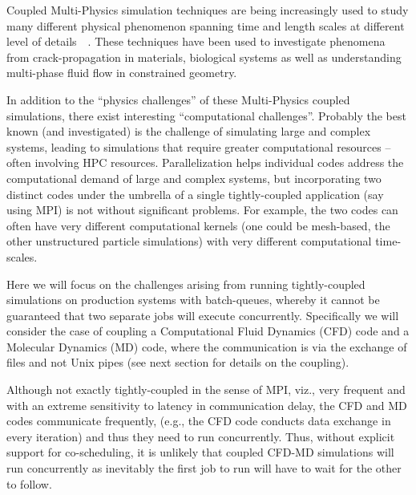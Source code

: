 \documentclass[conference,final]{IEEEtran}
\newcommand{\jhanote}[1]{ {\textcolor{red} { ***Jha: #1 }}}
\newcommand{\jhanote}[1]{}
\begin{document}
Coupled Multi-Physics simulation techniques are being increasingly
used to study many different physical phenomenon spanning time and
length scales at different level of
details~\cite{Tai}~\cite{Watanabe}. These techniques have been used to
investigate phenomena from crack-propagation in materials, biological
systems as well as understanding multi-phase fluid flow in constrained
geometry.

In addition to the ``physics challenges'' of these Multi-Physics
coupled simulations, there exist interesting ``computational
challenges''. Probably the best known (and investigated) is the
challenge of simulating large and complex systems, leading to
simulations that require greater computational resources -- often
involving HPC resources. %
Parallelization helps individual codes address the computational
demand of large and complex systems, but incorporating two distinct
codes under the umbrella of a single tightly-coupled application (say
using MPI) is not without significant problems. For example, the two
codes can often have very different computational kernels (one could
be mesh-based, the other unstructured particle simulations) with very
different computational time-scales.

Here we will focus on the challenges arising from running
tightly-coupled simulations on production systems with batch-queues,
whereby it cannot be guaranteed that two separate jobs will execute
concurrently. Specifically we will consider the case of coupling a
Computational Fluid Dynamics (CFD) code and a Molecular Dynamics (MD)
code, where the communication is via the exchange of files and not
Unix pipes (see next section for details on the coupling).


Although not exactly tightly-coupled in the sense of MPI, viz., very
frequent and with an extreme sensitivity to latency in communication
delay, the CFD and MD codes communicate frequently, (e.g., the CFD
code conducts data exchange in every iteration) and thus they need to
run concurrently. Thus, without explicit support for co-scheduling, it
is unlikely that coupled CFD-MD simulations will run concurrently as
inevitably the first job to run will have to wait for the other to
follow.

\end{document}
